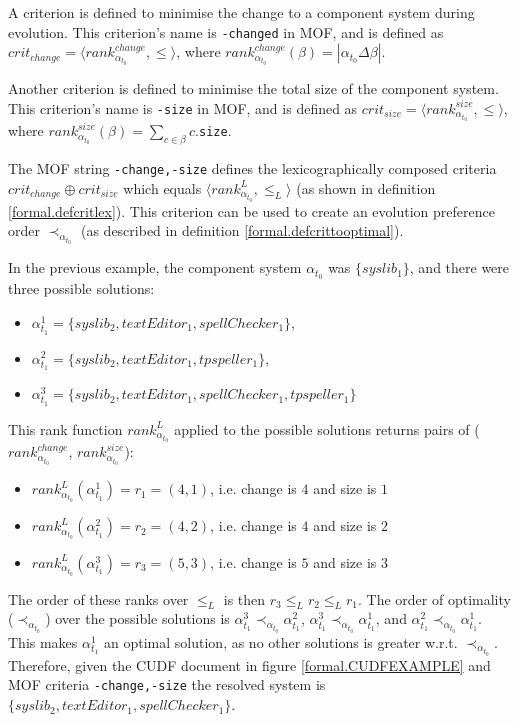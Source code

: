 A criterion is defined to minimise the change to a component system during evolution.
This criterion's name is \texttt{-changed} in MOF,
and is defined as $crit_{change} = \langle rank^{change}_{\alpha_{t_{0}}}, \leq \rangle$,
where $rank^{change}_{\alpha_{t_{0}}}(\beta) = |\alpha_{t_{0}} \Delta \beta|$.

Another criterion is defined to minimise the total size of the component system.
This criterion's name is \texttt{-size} in MOF,
and is defined as $crit_{size} = \langle rank^{size}_{\alpha_{t_{0}}}, \leq  \rangle$,
where $rank^{size}_{\alpha_{t_{0}}}(\beta) = \sum_{c \in \beta} c$.\verb+size+.
 
The MOF string \texttt{-change,-size} defines the lexicographically composed criteria $crit_{change} \oplus crit_{size}$ 
which equals $\langle rank^{L}_{\alpha_{t_{0}}}, \leq_L \rangle$ (as shown in definition \ref{formal.defcritlex}).
This criterion can be used to create an evolution preference order $\prec_{\alpha_{t_{0}}}$ (as described in definition \ref{formal.defcrittooptimal}).

In the previous example, the component system $\alpha_{t_{0}}$ was  $\{syslib_1\}$, and there were three possible solutions:
\begin{itemize}
  \item $\alpha_{t_1}^1 = \{syslib_2, textEditor_1, spellChecker_1\}$,
  \item $\alpha_{t_1}^2 = \{syslib_2, textEditor_1, tpspeller_1\}$,
  \item $\alpha_{t_1}^3 = \{syslib_2, textEditor_1, spellChecker_1, tpspeller_1\}$
\end{itemize}

This rank function $rank^{L}_{\alpha_{t_{0}}}$ applied to the possible solutions returns pairs of ($rank^{change}_{\alpha_{t_{0}}}$, $rank^{size}_{\alpha_{t_{0}}}$):
\begin{itemize}
  \item $rank^{L}_{\alpha_{t_{0}}}(\alpha_{t_1}^1 ) = r_1 = (4, 1)$, i.e. change is $4$ and size is $1$
  \item $rank^{L}_{\alpha_{t_{0}}}(\alpha_{t_1}^2 ) = r_2 = (4, 2)$, i.e. change is $4$ and size is $2$
  \item $rank^{L}_{\alpha_{t_{0}}}(\alpha_{t_1}^3 ) = r_3 = (5, 3)$, i.e. change is $5$ and size is $3$
\end{itemize}
The order of these ranks over $\leq_L$ is then $r_3 \leq_L r_2 \leq_L r_1$.
The order of optimality ($\prec_{\alpha_{t_{0}}}$) over the possible solutions is $\alpha_{t_1}^3 \prec_{\alpha_{t_{0}}} \alpha_{t_1}^2$, 
$\alpha_{t_1}^3 \prec_{\alpha_{t_{0}}} \alpha_{t_1}^1$, and $\alpha_{t_1}^2 \prec_{\alpha_{t_{0}}} \alpha_{t_1}^1$.
This makes $\alpha_{t_1}^1$ an optimal solution, as no other solutions is greater w.r.t. $\prec_{\alpha_{t_{0}}}$. 
Therefore, given the CUDF document in figure \ref{formal.CUDFEXAMPLE} and MOF criteria \texttt{-change,-size} the resolved system is $\{syslib_2, textEditor_1, spellChecker_1\}$.
